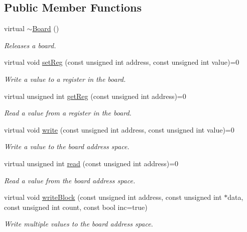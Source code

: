 \subsection*{Public Member Functions}
\begin{CompactItemize}
\item 
virtual \hyperlink{classmprace_1_1Board_a0}{$\sim$Board} ()
\begin{CompactList}\small\item\em Releases a board. \item\end{CompactList}\item 
virtual void \hyperlink{classmprace_1_1Board_a1}{set\-Reg} (const unsigned int address, const unsigned int value)=0
\begin{CompactList}\small\item\em Write a value to a register in the board. \item\end{CompactList}\item 
virtual unsigned int \hyperlink{classmprace_1_1Board_a2}{get\-Reg} (const unsigned int address)=0
\begin{CompactList}\small\item\em Read a value from a register in the board. \item\end{CompactList}\item 
virtual void \hyperlink{classmprace_1_1Board_a3}{write} (const unsigned int address, const unsigned int value)=0
\begin{CompactList}\small\item\em Write a value to the board address space. \item\end{CompactList}\item 
virtual unsigned int \hyperlink{classmprace_1_1Board_a4}{read} (const unsigned int address)=0
\begin{CompactList}\small\item\em Read a value from the board address space. \item\end{CompactList}\item 
virtual void \hyperlink{classmprace_1_1Board_a5}{write\-Block} (const unsigned int address, const unsigned int $\ast$data, const unsigned int count, const bool inc=true)
\begin{CompactList}\small\item\em Write multiple values to the board address space. \item\end{CompactList}\item 

\end{CompactItemize}
